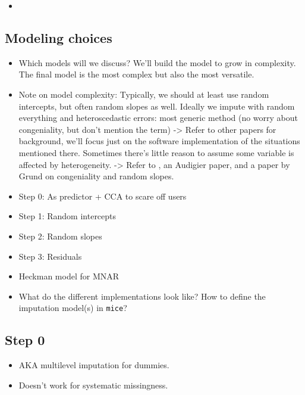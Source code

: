 \documentclass[
]{jss}
\providecommand{\tightlist}{%
  \setlength{\itemsep}{0pt}\setlength{\parskip}{0pt}}
\begin{document}
\begin{itemize}
\tightlist
\item
\end{itemize}

\hypertarget{modeling-choices}{%
\subsection{Modeling choices}\label{modeling-choices}}

\begin{itemize}
\item
  Which models will we discuss? We'll build the model to grow in
  complexity. The final model is the most complex but also the most
  versatile.
\item
  Note on model complexity: Typically, we should at least use random
  intercepts, but often random slopes as well. Ideally we impute with
  random everything and heteroscedastic errors: most generic method (no
  worry about congeniality, but don't mention the term) -\textgreater{}
  Refer to other papers for background, we'll focus just on the software
  implementation of the situations mentioned there. Sometimes there's
  little reason to assume some variable is affected by heterogeneity.
  -\textgreater{} Refer to \citet{meng94}, an Audigier paper, and a
  paper by Grund on congeniality and random slopes.
\item
  Step 0: As predictor + CCA to scare off users
\item
  Step 1: Random intercepts
\item
  Step 2: Random slopes
\item
  Step 3: Residuals
\item
  Heckman model for MNAR
\item
  What do the different implementations look like? How to define the
  imputation model(s) in \texttt{mice}?
\end{itemize}

\hypertarget{step-0}{%
\subsection{Step 0}\label{step-0}}

\begin{itemize}
\item
  AKA multilevel imputation for dummies.
\item
  Doesn't work for systematic missingness.
\end{itemize}
\end{document}
